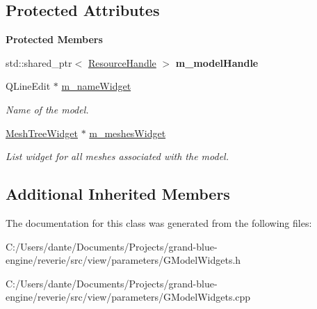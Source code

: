\subsection*{Protected Attributes}
\begin{Indent}\textbf{ Protected Members}\par
\begin{DoxyCompactItemize}
\item 
\mbox{\label{classrev_1_1_view_1_1_model_resource_widget_a6662595cedf6c5904de729f0a3d7cc8c}} 
std\+::shared\+\_\+ptr$<$ \mbox{\hyperlink{classrev_1_1_resource_handle}{Resource\+Handle}} $>$ {\bfseries m\+\_\+model\+Handle}
\item 
\mbox{\label{classrev_1_1_view_1_1_model_resource_widget_a8106d42050a230576c315f25f6e0af5a}} 
Q\+Line\+Edit $\ast$ \mbox{\hyperlink{classrev_1_1_view_1_1_model_resource_widget_a8106d42050a230576c315f25f6e0af5a}{m\+\_\+name\+Widget}}
\begin{DoxyCompactList}\small\item\em Name of the model. \end{DoxyCompactList}\item 
\mbox{\label{classrev_1_1_view_1_1_model_resource_widget_a16e616a16561aba0016ca08310d8cf78}} 
\mbox{\hyperlink{classrev_1_1_view_1_1_mesh_tree_widget}{Mesh\+Tree\+Widget}} $\ast$ \mbox{\hyperlink{classrev_1_1_view_1_1_model_resource_widget_a16e616a16561aba0016ca08310d8cf78}{m\+\_\+meshes\+Widget}}
\begin{DoxyCompactList}\small\item\em List widget for all meshes associated with the model. \end{DoxyCompactList}\end{DoxyCompactItemize}
\end{Indent}
\subsection*{Additional Inherited Members}


The documentation for this class was generated from the following files\+:\begin{DoxyCompactItemize}
\item 
C\+:/\+Users/dante/\+Documents/\+Projects/grand-\/blue-\/engine/reverie/src/view/parameters/G\+Model\+Widgets.\+h\item 
C\+:/\+Users/dante/\+Documents/\+Projects/grand-\/blue-\/engine/reverie/src/view/parameters/G\+Model\+Widgets.\+cpp\end{DoxyCompactItemize}
